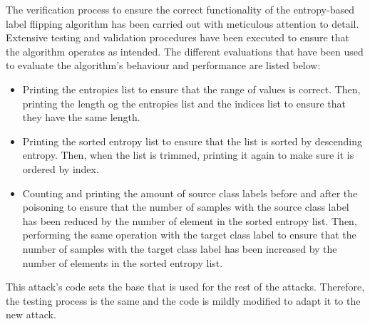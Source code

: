 
The verification process to ensure the correct functionality of the entropy-based label flipping algorithm has been carried out with meticulous attention to detail. Extensive testing and validation procedures have been executed to ensure that the algorithm operates as intended. The different evaluations that have been used to evaluate the algorithm's behaviour and performance are listed below:
\begin{itemize}
        \item Printing the entropies list to ensure that the range of values is correct. Then, printing the length og the entropies list and the indices list to ensure that they have the same length.
        \item Printing the sorted entropy list to ensure that the list is sorted by descending entropy. Then, when the list is trimmed, printing it again to make sure it is ordered by index.
        \item Counting and printing the amount of source class labels before and after the poisoning to ensure that the number of samples with the source class label has been reduced by the number of element in the sorted entropy list. Then, performing the same operation with the target class label to ensure that the number of samples with the target class label has been increased by the number of elements in the sorted entropy list.
\end{itemize}

This attack's code sets the base that is used for the rest of the attacks. Therefore, the testing process is the same and the code is mildly modified to adapt it to the new attack.

